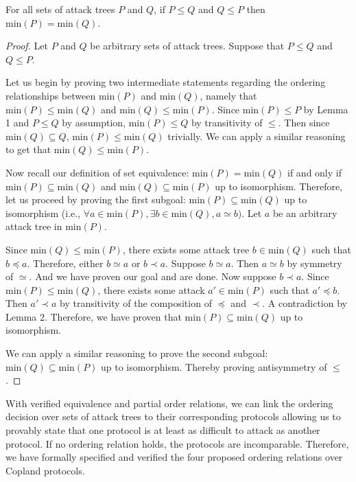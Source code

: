 \documentclass[runningheads]{llncs}
\theoremstyle{definition}
\begin{document}
\begin{theorem}
  For all sets of attack trees $P$ and $Q$, if $P \le Q$ and $Q \le P$ then $\text{min}(P) = \text{min}(Q)$. 
\end{theorem}
\begin{proof}
  Let $P$ and $Q$ be arbitrary sets of attack trees. Suppose that $P \le Q$ and $Q \le P$. 
  
  Let us begin by proving two intermediate statements regarding the ordering relationships between $\text{min}(P)$ and $\text{min}(Q)$, namely that $\text{min}(P) \leq \text{min}(Q)$ and $\text{min}(Q) \leq \text{min}(P)$. Since $\text{min}(P) \leq P$ by Lemma 1 and $P \leq Q$ by assumption, $\text{min}(P) \leq Q$ by transitivity of $\leq$. Then since $\text{min}(Q) \subseteq Q$, $\text{min}(P) \leq \text{min}(Q)$ trivially. We can apply a similar reasoning to get that $\text{min}(Q) \leq \text{min}(P)$.

  Now recall our definition of set equivalence: $\text{min}(P) = \text{min}(Q)$ if and only if $\text{min}(P) \subseteq \text{min}(Q)$ and $\text{min}(Q) \subseteq \text{min}(P)$ up to isomorphism. Therefore, let us proceed by proving the first subgoal: $\text{min}(P) \subseteq \text{min}(Q)$ up to isomorphism (i.e., $\forall a \in \text{min}(P), \exists b \in \text{min}(Q), a \simeq b)$.  Let $a$ be an arbitrary attack tree in $\text{min}(P)$. 

  Since $\text{min}(Q) \leq \text{min}(P)$, there exists some attack tree $b \in \text{min}(Q)$ such that $b \preceq a$. Therefore, either $b \simeq a$ or $b \prec a$. Suppose $b \simeq a$. Then $a \simeq b$ by symmetry of $\simeq$. And we have proven our goal and are done. Now suppose $b \prec a$. Since $\text{min}(P) \leq \text{min}(Q)$, there exists some attack $a' \in \text{min}(P)$ such that $a' \preceq b$. Then $a' \prec a$ by transitivity of the composition of $\preceq$ and $\prec$. A contradiction by Lemma 2. Therefore, we have proven that $\text{min}(P) \subseteq \text{min}(Q)$ up to isomorphism.
  
  We can apply a similar reasoning to prove the second subgoal: $\text{min}(Q) \subseteq \text{min}(P)$ up to isomorphism. Thereby proving antisymmetry of $\leq$.
\end{proof}


With verified equivalence and partial order relations, we can link the ordering decision over sets of attack trees to their corresponding protocols allowing us to provably state that one protocol is at least as difficult to attack as another protocol. If no ordering relation holds, the protocols are incomparable. Therefore, we have formally specified and verified the four proposed ordering relations over Copland protocols. 
\end{document}
